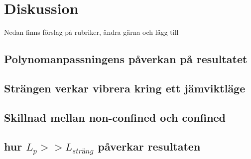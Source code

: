 \section{Diskussion}

Nedan finns förslag på rubriker, ändra gärna och lägg till

\subsection{Polynomanpassningens påverkan på resultatet}

\subsection{Strängen verkar vibrera kring ett jämviktläge}

\subsection{Skillnad mellan non-confined och confined}

\subsection{hur $L_{p}>>L_{sträng}$ påverkar resultaten}


